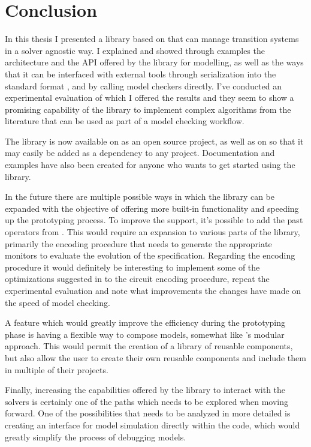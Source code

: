 \chapter{Conclusion}
\label{ch:conclusions}

In this thesis I presented \pyvmt{} a \python{} library based on \pysmt{} that can manage transition systems in a solver agnostic way.
I explained and showed through examples the architecture and the API offered by the library for modelling, as well as the ways that it can be interfaced with external tools through serialization into the standard format \vmtlib{}, and by calling model checkers directly.
I've conducted an experimental evaluation of which I offered the results and they seem to show a promising capability of the library to implement complex algorithms from the literature that can be used as part of a model checking workflow.

The library is now available on \github{} as an open source project, as well as on \pypi{} so that it may easily be added as a dependency to any project.
Documentation and examples have also been created for anyone who wants to get started using the library.

In the future there are multiple possible ways in which the library can be expanded with the objective of offering more built-in functionality and speeding up the prototyping process.
To improve the \ltl{} support, it's possible to add the past operators from \pltl{}.
This would require an expansion to various parts of the library, primarily the encoding procedure that needs to generate the appropriate monitors to evaluate the evolution of the specification.
Regarding the \ltl{} encoding procedure it would definitely be interesting to implement some of the optimizations suggested in \cite{DBLP:conf/fmcad/ClaessenES13} to the \ltl{} circuit encoding procedure, repeat the experimental evaluation and note what improvements the changes have made on the speed of model checking.

A feature which would greatly improve the efficiency during the prototyping phase is having a flexible way to compose models, somewhat like \nuxmv{}'s modular approach.
This would permit the creation of a library of reusable components, but also allow the user to create their own reusable components and include them in multiple of their projects.

Finally, increasing the capabilities offered by the library to interact with the solvers is certainly one of the paths which needs to be explored when moving forward.
One of the possibilities that needs to be analyzed in more detailed is creating an interface for model simulation directly within the \python{} code, which would greatly simplify the process of debugging models.
